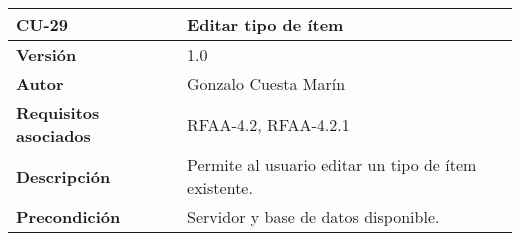 \begin{longtable}[]{@{}ll@{}}
\toprule
\begin{minipage}[b]{0.20\columnwidth}\raggedright
\textbf{CU-29}\strut
\end{minipage} & \begin{minipage}[b]{0.75\columnwidth}\raggedright
\textbf{Editar tipo de ítem}\strut
\end{minipage}\tabularnewline
\midrule
\endhead
\begin{minipage}[t]{0.20\columnwidth}\raggedright
\textbf{Versión}\strut
\end{minipage} & \begin{minipage}[t]{0.75\columnwidth}\raggedright
1.0\strut
\end{minipage}\tabularnewline
\begin{minipage}[t]{0.20\columnwidth}\raggedright
\textbf{Autor}\strut
\end{minipage} & \begin{minipage}[t]{0.75\columnwidth}\raggedright
Gonzalo Cuesta Marín\strut
\end{minipage}\tabularnewline
\begin{minipage}[t]{0.20\columnwidth}\raggedright
\textbf{Requisitos asociados}\strut
\end{minipage} & \begin{minipage}[t]{0.75\columnwidth}\raggedright
RFAA-4.2, RFAA-4.2.1\strut
\end{minipage}\tabularnewline
\begin{minipage}[t]{0.20\columnwidth}\raggedright
\textbf{Descripción}\strut
\end{minipage} & \begin{minipage}[t]{0.75\columnwidth}\raggedright
Permite al usuario editar un tipo de ítem existente.\strut
\end{minipage}\tabularnewline
\begin{minipage}[t]{0.20\columnwidth}\raggedright
\textbf{Precondición}\strut
\end{minipage} & \begin{minipage}[t]{0.75\columnwidth}\raggedright
Servidor y base de datos disponible.


\end{minipage}
\end{longtable}
